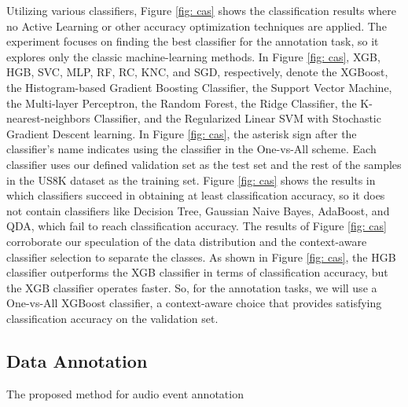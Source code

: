 \documentclass{article}
\begin{document}
Utilizing various classifiers, Figure \ref{fig: cas} shows the classification results where no Active Learning or other accuracy optimization techniques are applied. The experiment focuses on finding the best classifier for the annotation task, so it explores only the classic machine-learning methods. In Figure \ref{fig: cas}, XGB, HGB, SVC, MLP, RF, RC, KNC, and SGD, respectively, denote the XGBoost, the Histogram-based Gradient Boosting Classifier, the Support Vector Machine, the Multi-layer Perceptron, the Random Forest, the Ridge Classifier, the K-nearest-neighbors Classifier, and the Regularized Linear SVM with Stochastic Gradient Descent learning. In Figure \ref{fig: cas}, the asterisk sign after the classifier's name indicates using the classifier in the One-vs-All scheme. Each classifier uses our defined validation set as the test set and the rest of the samples in the US8K dataset as the training set. Figure \ref{fig: cas} shows the results in which classifiers succeed in obtaining at least  classification accuracy, so it does not contain classifiers like Decision Tree, Gaussian Naive Bayes, AdaBoost, and QDA, which fail to reach  classification accuracy. The results of Figure \ref{fig: cas} corroborate our speculation of the data distribution and the context-aware classifier selection to separate the classes. As shown in Figure \ref{fig: cas}, the HGB classifier outperforms the XGB classifier in terms of classification accuracy, but the XGB classifier operates faster. So, for the annotation tasks, we will use a One-vs-All XGBoost classifier, a context-aware choice that provides satisfying classification accuracy on the validation set. 

\subsection{Data Annotation}

 \begin{algorithm}
	\caption{The proposed method for audio event annotation}\label{alg: label}
	\;
	\;
	\;
	\;
	\;
	\;
	\;
	\;
	\;
	\;
	\For{ \KwTo  }{
		\If{}{
			\;
		}
	}
\end{algorithm}
\end{document}

